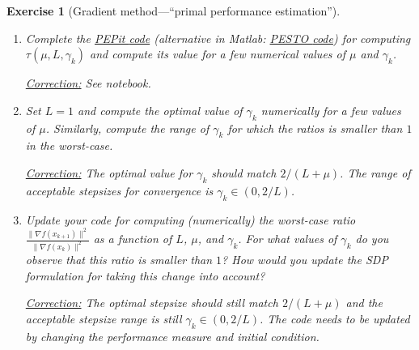 \documentclass[11pt,a4paper]{article}
\newcommand{\pesto}{{PESTO }}
\newcommand{\pepit}{{PEPit }}
\newcommand{\correction}[1]{{{\color{blue}\underline{Correction:} #1}}}
\newcommand{\correction}[1]{}
\newtheorem{exercise}{Exercise}
\begin{document}
\begin{exercise}[Gradient method---``primal performance estimation'']
\begin{enumerate}
	\item Complete the \href{https://github.com/PerformanceEstimation/Learning-Performance-Estimation/tree/main/Codes/Jupyter/Exercise01.ipynb}{\pepit code} (alternative in Matlab: \href{https://github.com/PerformanceEstimation/Learning-Performance-Estimation/blob/main/Codes/Matlab/Exercise1.m}{\pesto code}) for computing $\tau(\mu,L,\gamma_k)$ and compute its value for a few numerical values of $\mu$ and $\gamma_k$.
	
	\correction{See notebook.}
	
	\item Set $L=1$ and compute the optimal value of $\gamma_k$ numerically for a few values of $\mu$. Similarly, compute the range of $\gamma_k$ for which the ratios is smaller than $1$ in the worst-case.
	
	\correction{The optimal value for $\gamma_k$ should match $2/(L+\mu)$. The range of acceptable stepsizes for convergence is $\gamma_k\in(0,2/L)$.}
	
	\item Update your code for computing (numerically) the worst-case ratio $\frac{\|\nabla f(x_{k+1})\|^2}{\|\nabla f(x_k)\|^2}$ as a function of $L$, $\mu$, and $\gamma_k$. For what values of $\gamma_k$ do you observe that this ratio is smaller than $1$?  How would you update the SDP formulation for taking this change into account?
	
	\correction{The optimal stepsize should still match $2/(L+\mu)$ and the acceptable stepsize range is still $\gamma_k\in(0,2/L)$. The code needs to be updated by changing the performance measure and initial condition.
	
}
\end{enumerate}
\end{exercise}
\end{document}
